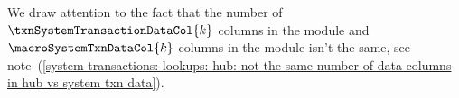 \saNote{}
We draw attention to the fact that the number of
$\txnSystemTransactionDataCol{k}$ columns in the \hubMod{} module and
$\macroSystemTxnDataCol{k}$ columns in the \systTxnDataMod{} module
isn't the same,
see note~(\ref{system transactions: lookups: hub: not the same number of data columns in hub vs system txn data}).
